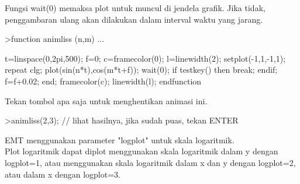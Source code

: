 \documentclass[a4paper,10pt]{article}
\begin{document}
\begin{eulernotebook}
\begin{eulercomment}
\begin{eulercomment}
\begin{eulercomment}
\begin{eulercomment}
\begin{eulercomment}
\begin{eulercomment}
\begin{eulercomment}
\begin{eulercomment}
\begin{eulercomment}
\begin{eulercomment}
\begin{eulercomment}
\begin{eulercomment}
\begin{eulercomment}
Fungsi wait(0) memaksa plot untuk muncul di jendela grafik. Jika
tidak, penggambaran ulang akan dilakukan dalam interval waktu yang
jarang.
\end{eulercomment}
\begin{eulerprompt}
>function animliss (n,m) ...
\end{eulerprompt}
\begin{eulerudf}
  t=linspace(0,2pi,500);
  f=0;
  c=framecolor(0);
  l=linewidth(2);
  setplot(-1,1,-1,1);
  repeat
    clg;
    plot(sin(n*t),cos(m*t+f));
    wait(0);
    if testkey() then break; endif;
    f=f+0.02;
  end;
  framecolor(c);
  linewidth(l);
  endfunction
\end{eulerudf}
\begin{eulercomment}
Tekan tombol apa saja untuk menghentikan animasi ini.
\end{eulercomment}
\begin{eulerprompt}
>animliss(2,3); // lihat hasilnya, jika sudah puas, tekan ENTER
\end{eulerprompt}
\begin{eulercomment}
EMT menggunakan parameter "logplot" untuk skala logaritmik.\\
Plot logaritmik dapat diplot menggunakan skala logaritmik dalam y
dengan logplot=1, atau menggunakan skala logaritmik dalam x dan y
dengan logplot=2, atau dalam x dengan logplot=3.


\end{eulercomment}
\end{eulercomment}
\end{eulercomment}
\end{eulercomment}
\end{eulercomment}
\end{eulercomment}
\end{eulercomment}
\end{eulercomment}
\end{eulercomment}
\end{eulercomment}
\end{eulercomment}
\end{eulercomment}
\end{eulercomment}
\end{eulernotebook}
\end{document}
